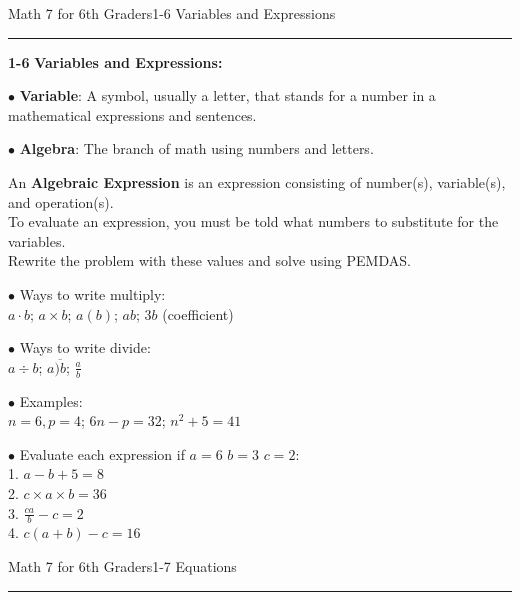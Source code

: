 \begin{enumerate*}
\noindent\Large{Math 7 for 6th Graders\hfill 1-6 Variables and Expressions}
\noindent\hrule
\vspace{5mm}

		\item[\Large\textbf{1-6}] \Large\textbf{Variables and Expressions:}\\
			\begin{enumerate*}
				\item[$\bullet$]\textbf{Variable}: A symbol, usually a letter, that stands for a number in a mathematical expressions and sentences.\\
				\item[$\bullet$]\textbf{Algebra}: The branch of math using numbers and letters.\\
				\item[]An \textbf{Algebraic Expression} is an expression consisting of number(s), variable(s), and operation(s).\\
					To evaluate an expression, you must be told what numbers to substitute for the variables.\\
					Rewrite the problem with these values and solve using PEMDAS.
				\item[$\bullet$]Ways to write multiply:\\
					$a\cdot b$; $a\times b$; $a(b)$; $ab$; $3b$ (coefficient)\\
				\item[$\bullet$]Ways to write divide:\\
				$a\div b$; $a\overline{)b}$; $\frac{a}{b}$\\
			\item[$\bullet$]Examples:\\
				$n=6, p=4$; $6n-p=32$; $n^2+5=41$\\
			 \item[$\bullet$]Evaluate each expression if $a=6$ $b=3$ $c=2$:\\
			 	1. $a-b+5=8$\\
			 	2. $c\times a\times b=36$\\
			 	3. $\frac{ca}{b}-c=2$\\
			 	4. $c(a+b)-c=16$\\			
			\end{enumerate*}

\newpage
\noindent\Large{Math 7 for 6th Graders\hfill 1-7 Equations}
\noindent\hrule
\vspace{5mm}


\end{enumerate*}
